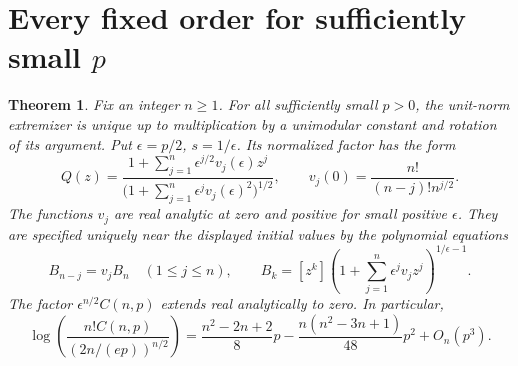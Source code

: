 \documentclass[11pt]{article}
\newtheorem{theorem}{Theorem}
\begin{document}
\section{Every fixed order for sufficiently small \texorpdfstring{\(p\)}{p}}
\label{sec:small-p}

\begin{theorem}\label{thm:small-p}
Fix an integer \(n\geq1\). For all sufficiently small \(p>0\),
the unit-norm extremizer is unique up to multiplication by a
unimodular constant and rotation of its argument. Put
\(\epsilon=p/2\), \(s=1/\epsilon\). Its normalized factor has the form
\[
 Q(z)=\frac{1+\sum_{j=1}^n\epsilon^{j/2}v_j(\epsilon)z^j}
               {\bigl(1+\sum_{j=1}^n\epsilon^jv_j(\epsilon)^2\bigr)^{1/2}} ,
 \qquad
 v_j(0)=\frac{n!}{(n-j)!n^{j/2}} .
\]
The functions \(v_j\) are real analytic at zero and positive for
small positive \(\epsilon\). They are specified uniquely near the
displayed initial values by the polynomial equations
\begin{equation}\label{eq:small-polynomials}
 B_{n-j}=v_j B_n\quad (1\le j\le n),\qquad
 B_k=[z^k]\left(1+\sum_{j=1}^n\epsilon^j v_jz^j\right)^{1/\epsilon-1}.
\end{equation}
The factor \(\epsilon^{n/2}C(n,p)\) extends real analytically to zero.
In particular,
\[
 \log\left(\frac{n!C(n,p)}{(2n/(ep))^{n/2}}\right)
  =\frac{n^2-2n+2}{8}p
   -\frac{n(n^2-3n+1)}{48}p^2+O_n(p^3).
\]
\end{theorem}
\end{document}
